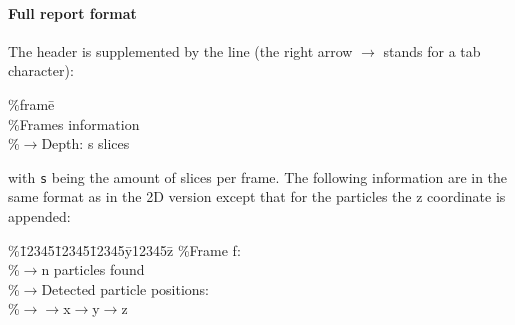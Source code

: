 \documentclass{scrartcl}
\begin{document}
\paragraph{Full report format}
The header is supplemented by the line (the right arrow $\rightarrow$ stands for a tab character): 
\begin{flushleft}
  \ttfamily
  \begin{tabbing}
    \%frame\= \kill \\
    \%Frames information \\
    \%$\rightarrow$\>Depth: s slices
  \end{tabbing}
\end{flushleft}
with \texttt{s} being the amount of slices per frame. 
The following information are in the same format as in the 2D version except that for the particles the z coordinate is appended:
\begin{flushleft}
  \ttfamily
  \begin{tabbing}
    \%\=12345\=12345\=12345\=y12345\=z \kill
    \%\>Frame f:\\
    \%\>$\rightarrow$\>n particles found\\
    \%\>$\rightarrow$\>Detected particle positions: \\
    \%\>$\rightarrow$\>$\rightarrow$\>x$\rightarrow$\>y$\rightarrow$\>z
  \end{tabbing}
\end{flushleft}
\end{document}
